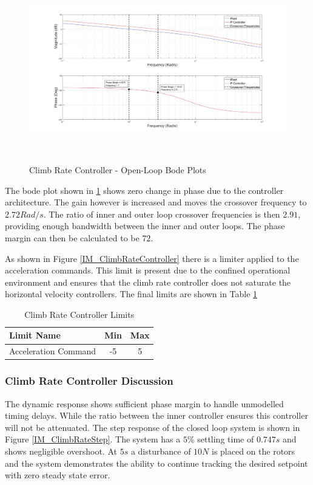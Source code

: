 \documentclass[12pt]{report}
\begin{document}
	\begin{figure}[H]
		\centering
		\includegraphics[height = 8cm]{../Design/Matlab/Controllers/climb_rate_bode.jpg}
		\caption{Climb Rate Controller - Open-Loop Bode Plots}
		\label{IM_ClimbRateBode}
	\end{figure}
	
	The bode plot shown in \ref{IM_ClimbRateBode} shows zero change in phase due to the controller architecture. The gain however is increased and moves the crossover frequency to $2.72 Rad/s$. The ratio of inner and outer loop crossover frequencies is then $2.91$, providing enough bandwidth between the inner and outer loops. The phase margin can then be calculated to be $72$\textdegree. 
	
	As shown in Figure \ref{IM_ClimbRateController} there is a limiter applied to the acceleration commands. This limit is present due to the confined operational environment and ensures that the climb rate controller does not saturate the horizontal velocity controllers. The final limits are shown in Table \ref{tab:ClimbrateLimits}
	
	\begin{table}[!]
		\centering
		\begin{tabular}{l | c | c |}
			Limit Name 						& Min & Max\\
			\hline\hline
			Acceleration Command 		    & -5 & 5 \\
		\end{tabular}
		\caption{Climb Rate Controller Limits}
		\label{tab:ClimbrateLimits}
	\end{table}
	
	\subsubsection{Climb Rate Controller Discussion}
	The dynamic response shows sufficient phase margin to handle unmodelled timing delays. While the ratio between the inner controller ensures this controller will not be attenuated. The step response of the closed loop system is shown in Figure \ref{IM_ClimbRateStep}. The system has a $5$\% settling time of $0.747s$ and shows negligible overshoot. At $5s$ a disturbance of $10N$ is placed on the rotors and the system demonstrates the ability to continue tracking the desired setpoint with zero steady state error.
	
\end{document}
